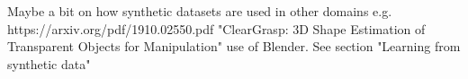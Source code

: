 



Maybe a bit on how synthetic datasets are used in other domains e.g. https://arxiv.org/pdf/1910.02550.pdf "ClearGrasp:
3D Shape Estimation of Transparent Objects for Manipulation" use of Blender. See section "Learning from synthetic data"









